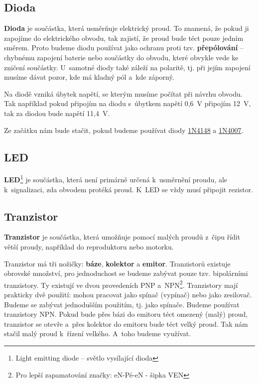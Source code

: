 \subsection{Dioda}

{\bf Dioda}  je součástka, která usměrňuje elektrický proud. 
To znamená, že pokud ji zapojíme do elektrického obvodu, tak zajistí, že proud bude téct pouze jedním směrem. 
Proto budeme diodu používat jako ochranu 
proti tzv. {\bf přepólování}
 -- chybnému zapojení baterie nebo součástky do obvodu, které obvykle vede ke zničení součástky. 
U~samotné diody také záleží na polaritě, tj. při jejím zapojení musíme dávat pozor, kde má kladný pól a~kde záporný. 

Na diodě vzniká úbytek napětí, se kterým musíme počítat při návrhu obvodu. 
Tak například pokud připojím na diodu s~úbytkem napětí 0,6~V připojím 12~V, tak za diodou bude napětí 11,4~V. 

Ze začátku nám bude stačit, pokud budeme používat diody  
 \hyperlink{1N4148}{1N4148} a 
 \hyperlink{1N4007}{1N4007}.
   
\subsection{LED}

\hypertarget{LED}{}  
{\bf LED}\footnote{Light emitting diode -- světlo vysílající dioda}
je součástka, která není primárně určená k~usměrnění proudu, ale k~signalizaci, zda obvodem protéká proud.
K~LED se vždy musí připojit rezistor. 

\subsection{Tranzistor}

\hypertarget{tranzistor}{}
{\bf Tranzistor} je součástka, která umožňuje pomocí malých proudů z~čipu řídit větší proudy, například do reproduktoru nebo motorku. 

Tranzistor má tři nožičky: {\bf báze}, {\bf kolektor} a {\bf emitor}. 
Tranzistorů existuje obrovské množství, pro jednoduchost se budeme zabývat pouze tzv. bipolárními tranzistory.
 Ty existují ve dvou provedeních PNP a~NPN\footnote{Pro lepší zapamatování značky: eN-Pé-eN - šipka VEN}. 
 Tranzistory mají prakticky dvě použití: mohou pracovat jako spínač (vypínač) nebo jako zesilovač.
  Budeme se zabývat jednodušším použitím, tj. jako spínače. 
  Budeme používat tranzistory NPN. 
  Pokud bude přes bázi do emitoru téct omezený (malý) proud, tranzistor se otevře a~přes kolektor do emitoru bude téct velký proud. 
  Tak nám stačil malý proud k~řízení velkého. A~toho budeme využívat. 

